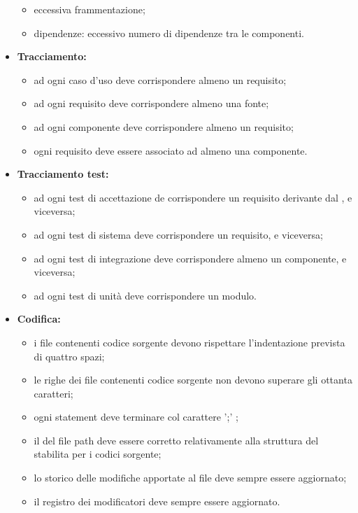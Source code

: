 \begin{itemize}
\begin{itemize}
		\item eccessiva frammentazione;
		\item dipendenze: eccessivo numero di dipendenze tra le componenti.
	\end{itemize}
	\item \textbf{Tracciamento:}
	\begin{itemize}
		\item ad ogni caso d'uso deve corrispondere almeno un requisito;
		\item ad ogni requisito deve corrispondere almeno una fonte;
		\item ad ogni componente deve corrispondere almeno un requisito;
		\item ogni requisito deve essere associato ad almeno una componente.
	\end{itemize}
	\item \textbf{Tracciamento test:}
	\begin{itemize}
		\item ad ogni test di accettazione de corrispondere un requisito derivante dal , e viceversa;
		\item ad ogni test di sistema deve corrispondere un requisito, e viceversa;
		\item ad ogni test di integrazione deve corrispondere almeno un componente, e viceversa;
		\item ad ogni test di unità deve corrispondere un modulo.
	\end{itemize}
	\item \textbf{Codifica:}
	\begin{itemize}
		\item i file contenenti codice sorgente devono rispettare l'indentazione prevista di quattro spazi;
		\item le righe dei file contenenti codice sorgente non devono superare gli ottanta caratteri;
		\item ogni statement deve terminare col carattere ';' ;
		\item il del file path deve essere corretto relativamente alla struttura del  stabilita per i codici sorgente;
		\item lo storico delle modifiche apportate al file deve sempre essere aggiornato;
		\item il registro dei modificatori deve sempre essere aggiornato.
	\end{itemize}
\end{itemize}

